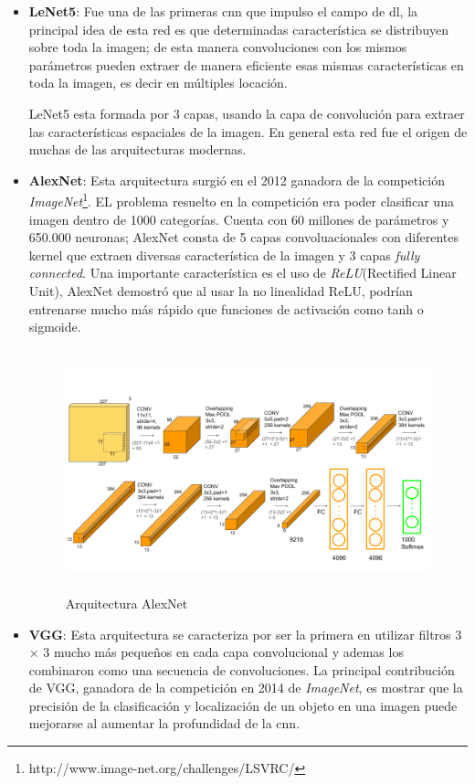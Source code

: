 \begin{itemize}
\item \textbf{LeNet5}: Fue una de las primeras \ac{cnn} que impulso el campo de \ac{dl}, la principal idea de esta red es que determinadas característica se distribuyen sobre toda la imagen; de esta manera convoluciones con los mismos parámetros pueden extraer de manera eficiente esas mismas características en toda la imagen, es decir en múltiples locación. 

LeNet5 esta formada por 3 capas, usando la capa de convolución para extraer las características espaciales de la imagen. En general esta red fue el origen de muchas de las arquitecturas modernas.

\item \textbf{AlexNet}: Esta arquitectura surgió en el 2012 ganadora de la competición \textit{ImageNet}\footnote{http://www.image-net.org/challenges/LSVRC/}. EL problema resuelto en la competición era poder clasificar una imagen dentro de 1000 categorías. Cuenta con 60 millones de parámetros y 650.000 neuronas; AlexNet consta de 5 capas convoluacionales con diferentes kernel que extraen diversas característica de la imagen  y 3 capas \textit{fully connected}. Una importante característica es el uso de \textit{ReLU}(Rectified Linear Unit),  AlexNet demostró que al usar la no linealidad ReLU,  podrían entrenarse mucho más rápido que  funciones de activación como  tanh o sigmoide.

\begin{figure}[H]
 \centering
  \includegraphics[height=7cm,keepaspectratio=true,clip=true]{imagenes/MarcoTeorico/AlexNet-1.png}
  \caption{Arquitectura AlexNet}
	\label{Fig:alexnet}
\end{figure}


\item \textbf{VGG}: Esta arquitectura se caracteriza por ser la primera en utilizar filtros 3 × 3 mucho más pequeños en cada capa convolucional y ademas los combinaron como una secuencia de convoluciones. La principal contribución de VGG, ganadora de la competición en 2014 de \textit{ImageNet}, es mostrar que la precisión de la clasificación y localización de un objeto en una imagen puede mejorarse al aumentar la profundidad de la \ac{cnn}.


\end{itemize}
